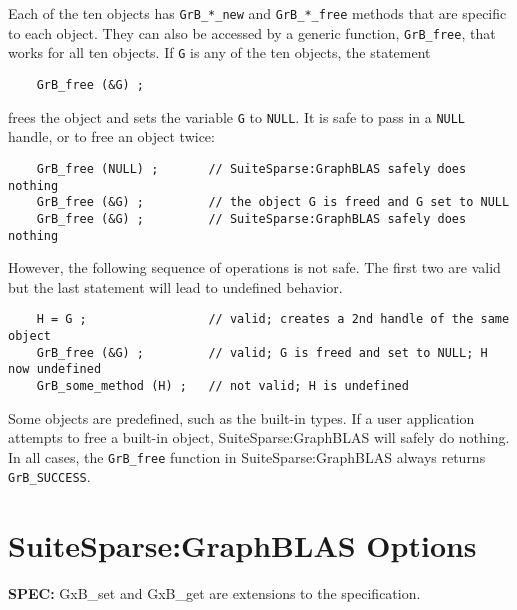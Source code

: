 \documentclass[12pt]{article}
\begin{document}
Each of the ten objects has \verb'GrB_*_new' and \verb'GrB_*_free' methods
that are specific to each object.  They can also be accessed by a generic
function, \verb'GrB_free', that works for all ten objects.  If \verb'G' is any
of the ten objects, the statement

    {\footnotesize
    \begin{verbatim}
    GrB_free (&G) ; \end{verbatim} }

\noindent
frees the object and sets the variable \verb'G' to \verb'NULL'.  It is safe to
pass in a \verb'NULL' handle, or to free an object twice:

    {\footnotesize
    \begin{verbatim}
    GrB_free (NULL) ;       // SuiteSparse:GraphBLAS safely does nothing
    GrB_free (&G) ;         // the object G is freed and G set to NULL
    GrB_free (&G) ;         // SuiteSparse:GraphBLAS safely does nothing \end{verbatim} }

\noindent
However, the following sequence of operations is not safe.  The first two are
valid but the last statement will lead to undefined behavior.

    {\footnotesize
    \begin{verbatim}
    H = G ;                 // valid; creates a 2nd handle of the same object
    GrB_free (&G) ;         // valid; G is freed and set to NULL; H now undefined
    GrB_some_method (H) ;   // not valid; H is undefined \end{verbatim}}

Some objects are predefined, such as the built-in types.  If a user application
attempts to free a built-in object, SuiteSparse:GraphBLAS will safely do
nothing.  In all cases, the \verb'GrB_free' function in SuiteSparse:GraphBLAS
always returns \verb'GrB_SUCCESS'.




\newpage
\section{SuiteSparse:GraphBLAS Options} %
\label{options}

\begin{spec}
{\bf SPEC:} {\sf GxB\_set} and {\sf GxB\_get} are extensions to the
specification.
\end{spec}
\end{document}
